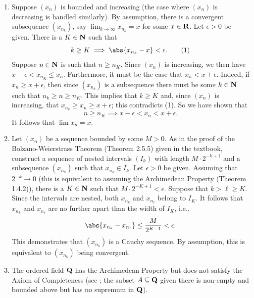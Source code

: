 \documentclass{lew98_solutions}
\begin{document}
\begin{solution}
    \begin{enumerate}
        \item Suppose \( (x_n) \) is bounded and increasing (the case where \( (x_n) \) is decreasing is handled similarly). By assumption, there is a convergent subsequence \( (x_{n_k}) \), say \( \lim_{k \to \infty} x_{n_k} = x \) for some \( x \in \mathbf{R} \). Let \( \epsilon > 0 \) be given. There is a \( K \in \mathbf{N} \) such that
        \[
            k \geq K \implies \abs{x_{n_k} - x} < \epsilon. \tag{1}
        \]
        Suppose \( n \in \mathbf{N} \) is such that \( n \geq n_K \). Since \( (x_n) \) is increasing, we then have \( x - \epsilon < x_{n_K} \leq x_n \). Furthermore, it must be the case that \( x_n < x + \epsilon \). Indeed, if \( x_n \geq x + \epsilon \), then since \( (x_{n_k}) \) is a subsequence there must be some \( k \in \mathbf{N} \) such that \( n_k \geq n \geq n_K \). This implies that \( k \geq K \) and, since \( (x_n) \) is increasing, that \( x_{n_k} \geq x_n \geq x + \epsilon \); this contradicts (1). So we have shown that
        \[
            n \geq n_K \implies x - \epsilon < x_n < x + \epsilon.
        \]
        It follows that \( \lim x_n = x \).

        \item Let \( (x_n) \) be a sequence bounded by some \( M > 0 \). As in the proof of the Bolzano-Weierstrass Theorem (Theorem 2.5.5) given in the textbook, construct a sequence of nested intervals \( (I_k) \) with length \( M \cdot 2^{-k+1} \) and a subsequence \( (x_{n_k}) \) such that \( x_{n_k} \in I_k \). Let \( \epsilon > 0 \) be given. Assuming that \( 2^{-k} \to 0 \) (this is equivalent to assuming the Archimedean Property (Theorem 1.4.2)), there is a \( K \in \mathbf{N} \) such that \( M \cdot 2^{-K+1} < \epsilon \). Suppose that \( k > \ell \geq K \). Since the intervals are nested, both \( x_{n_k} \) and \( x_{n_{\ell}} \) belong to \( I_K \). It follows that \( x_{n_k} \) and \( x_{n_{\ell}} \) are no further apart than the width of \( I_K \), i.e.,
        \[
            \abs{x_{n_k} - x_{n_{\ell}}} \leq \frac{M}{2^{K-1}} < \epsilon.
        \]
        This demonstrates that \( (x_{n_k}) \) is a Cauchy sequence. By assumption, this is equivalent to \( (x_{n_k}) \) being convergent.

        \item The ordered field \( \mathbf{Q} \) has the Archimedean Property but does not satisfy the Axiom of Completeness (see ; the subset \( A \subseteq \mathbf{Q} \) given there is non-empty and bounded above but has no supremum in \( \mathbf{Q} \)).
    \end{enumerate}
\end{solution}
\end{document}
